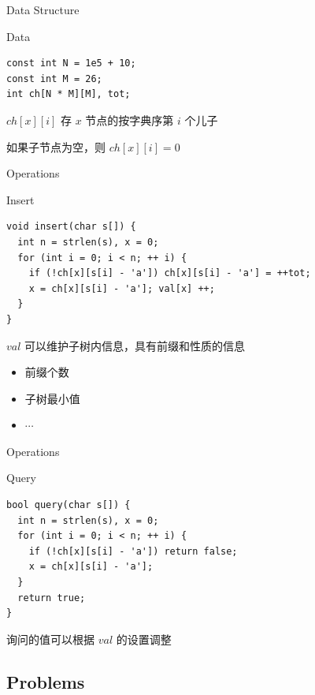 \documentclass{beamer}
\begin{document}
\begin{frame}[fragile]{Data Structure}
  \begin{block}{Data}
    \begin{lstlisting}
const int N = 1e5 + 10;
const int M = 26;
int ch[N * M][M], tot;
    \end{lstlisting}
  \end{block}
  $ch[x][i]$ 存 $x$ 节点的按字典序第 $i$ 个儿子
  
  如果子节点为空，则 $ch[x][i] = 0$
\end{frame}

\begin{frame}[fragile]{Operations}
  \begin{block}{Insert}
    \begin{lstlisting}
void insert(char s[]) {
  int n = strlen(s), x = 0;
  for (int i = 0; i < n; ++ i) {
    if (!ch[x][s[i] - 'a']) ch[x][s[i] - 'a'] = ++tot;
    x = ch[x][s[i] - 'a']; val[x] ++;
  }
}
    \end{lstlisting}
  \end{block}

  $val$ 可以维护子树内信息，具有前缀和性质的信息

  \begin{itemize}
    \item 前缀个数
    \item 子树最小值
    \item $\cdots$
  \end{itemize}
\end{frame}

\begin{frame}[fragile]{Operations}
  \begin{block}{Query}
    \begin{lstlisting}
bool query(char s[]) {
  int n = strlen(s), x = 0;
  for (int i = 0; i < n; ++ i) {
    if (!ch[x][s[i] - 'a']) return false;
    x = ch[x][s[i] - 'a'];
  }
  return true;
}
    \end{lstlisting}
  \end{block}

  询问的值可以根据 $val$ 的设置调整
\end{frame}

\subsection{Problems}
\end{document}
